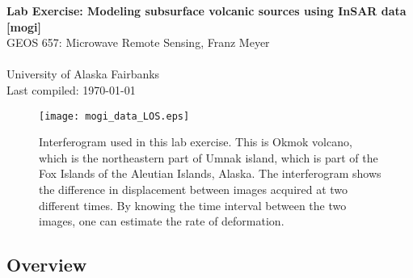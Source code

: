 \documentclass[11pt,titlepage,fleqn]{article}
\begin{document}

\begin{spacing}{1.2}
\centering
{\large \bf Lab Exercise: Modeling subsurface volcanic sources using InSAR data [mogi]} \\
GEOS 657: Microwave Remote Sensing, Franz Meyer \\
\cltag\ \\
University of Alaska Fairbanks \\
Last compiled: \today
\end{spacing}


\begin{figure}[h]
\centering
\texttt{[image: mogi\_data\_LOS.eps]}
\caption[]
{{
Interferogram used in this lab exercise. This is Okmok volcano, which is the northeastern part of Umnak island, which is part of the Fox Islands of the Aleutian Islands, Alaska. The interferogram shows the difference in displacement between images acquired at two different times. By knowing the time interval between the two images, one can estimate the rate of deformation.
\label{data}
}}
\end{figure}


\pagebreak
\subsection*{Overview}
\end{document}
